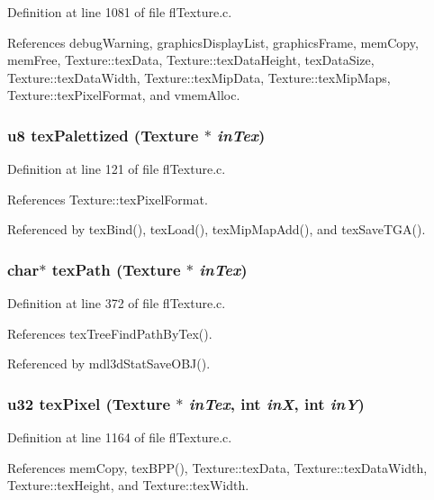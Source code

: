 Definition at line 1081 of file fl\-Texture.c.

References debug\-Warning, graphics\-Display\-List, graphics\-Frame, mem\-Copy, mem\-Free, Texture::tex\-Data, Texture::tex\-Data\-Height, tex\-Data\-Size, Texture::tex\-Data\-Width, Texture::tex\-Mip\-Data, Texture::tex\-Mip\-Maps, Texture::tex\-Pixel\-Format, and vmem\-Alloc.
\subsubsection{\setlength{\rightskip}{0pt plus 5cm}u8 tex\-Palettized ({\bf Texture} $\ast$ {\em in\-Tex})\hspace{0.3cm}{\tt  [inline]}}\label{flTexture_8h_b4c79c10195fdf369c6c9152a350eb78}




Definition at line 121 of file fl\-Texture.c.

References Texture::tex\-Pixel\-Format.

Referenced by tex\-Bind(), tex\-Load(), tex\-Mip\-Map\-Add(), and tex\-Save\-TGA().
\subsubsection{\setlength{\rightskip}{0pt plus 5cm}char$\ast$ tex\-Path ({\bf Texture} $\ast$ {\em in\-Tex})}\label{flTexture_8h_2aae7806529590f9b74414da4a2c20a8}




Definition at line 372 of file fl\-Texture.c.

References tex\-Tree\-Find\-Path\-By\-Tex().

Referenced by mdl3d\-Stat\-Save\-OBJ().
\subsubsection{\setlength{\rightskip}{0pt plus 5cm}u32 tex\-Pixel ({\bf Texture} $\ast$ {\em in\-Tex}, int {\em in\-X}, int {\em in\-Y})}\label{flTexture_8h_d448cd310f08ef57c369e1dfa10cfa3b}




Definition at line 1164 of file fl\-Texture.c.

References mem\-Copy, tex\-BPP(), Texture::tex\-Data, Texture::tex\-Data\-Width, Texture::tex\-Height, and Texture::tex\-Width.
